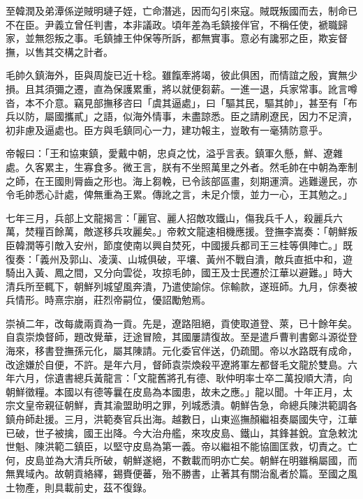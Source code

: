 \begin{pinyinscope}
至韓潤及弟潭係逆賊明璉子姪，亡命潛逃，因而勾引來寇。賊既叛國而去，制命已不在臣。尹義立曾任判書，本非議政。頃年差為毛鎮接伴官，不稱任使，褫職歸家，並無怨叛之事。毛鎮據王仲保等所訴，都無實事。意必有讒邪之臣，欺妄督撫，以售其交構之計者。

毛帥久鎮海外，臣與周旋已近十稔。雖餼牽將竭，彼此俱困，而情誼之殷，實無少損。且其須彌之遷，直為保護累重，將以就便芻薪。一進一退，兵家常事。訛言噂沓，本不介意。竊見部撫移咨曰「虞其逼處」，曰「驅其民，驅其帥」，甚至有「布兵以防，屬國攜貳」之語，似海外情事，未盡諒悉。臣之請刷遼民，因力不足濟，初非慮及逼處也。臣方與毛鎮同心一力，建功報主，豈敢有一毫猜防意乎。

帝報曰：「王和協東鎮，愛戴中朝，忠貞之忱，溢乎言表。鎮軍久懸，鮮、遼雜處。久客累主，生寡食多。微王言，朕有不坐照萬里之外者。然毛帥在中朝為牽制之師，在王國則脣齒之形也。海上芻輓，已令該部區畫，刻期運濟。逃難邊民，亦令毛帥悉心計處，俾無重為王累。傳訛之言，未足介懷，並力一心，王其勉之。」

七年三月，兵部上文龍揭言：「麗官、麗人招敵攻鐵山，傷我兵千人，殺麗兵六萬，焚糧百餘萬，敵遂移兵攻麗矣。」帝敕文龍速相機應援。登撫李嵩奏：「朝鮮叛臣韓潤等引敵入安州，節度使南以興自焚死，中國援兵都司王三桂等俱陣亡。」既復奏：「義州及郭山、凌漢、山城俱破，平壤、黃州不戰自潰，敵兵直抵中和，遊騎出入黃、鳳之間，又分向雲從，攻掠毛帥，國王及士民遷於江華以避難。」時大清兵所至輒下，朝鮮列城望風奔潰，乃遣使諭倧。倧輸款，遂班師。九月，倧奏被兵情形。時熹宗崩，莊烈帝嗣位，優詔勵勉焉。

崇禎二年，改每歲兩貢為一貢。先是，遼路阻絕，貢使取道登、萊，已十餘年矣。自袁崇煥督師，題改覺華，迂途冒險，其國屢請復故。至是遣戶曹判書鄭斗源從登海來，移書登撫孫元化，屬其陳請。元化委官伴送，仍疏聞。帝以水路既有成命，改途嫌於自便，不許。是年六月，督師袁崇煥殺平遼將軍左都督毛文龍於雙島。六年六月，倧遺書總兵黃龍言：「文龍舊將孔有德、耿仲明率士卒二萬投順大清，向朝鮮徵糧。本國以有德等曩在皮島為本國患，故未之應。」龍以聞。十年正月，太宗文皇帝親征朝鮮，責其渝盟助明之罪，列城悉潰。朝鮮告急，命總兵陳洪範調各鎮舟師赴援。三月，洪範奏官兵出海。越數日，山東巡撫顏繼祖奏屬國失守，江華已破，世子被擒，國王出降。今大治舟艦，來攻皮島、鐵山，其鋒甚銳。宜急敕沈世魁、陳洪範二鎮臣，以堅守皮島為第一義。帝以繼祖不能協圖匡救，切責之。亡何，皮島並為大清兵所破，朝鮮遂絕，不數載而明亦亡矣。朝鮮在明雖稱屬國，而無異域內。故朝貢絡繹，錫賚便蕃，殆不勝書，止著其有關治亂者於篇。至國之風土物產，則具載前史，茲不復錄。


\end{pinyinscope}